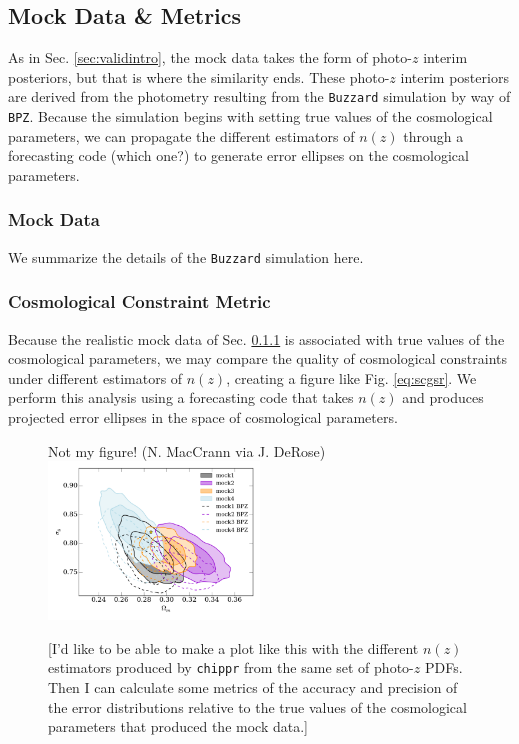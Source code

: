 \documentclass[iop]{emulateapj}
\begin{document}
\subsection{Mock Data \& Metrics}
\label{sec:appintro}

As in Sec. \ref{sec:validintro}, the mock data takes the form of photo-$z$ 
interim posteriors, but that is where the similarity ends.  These photo-$z$ 
interim posteriors are derived from the photometry resulting from the 
\texttt{Buzzard} simulation by way of \texttt{BPZ}.  Because the simulation 
begins with setting true values of the cosmological parameters, we can 
propagate the different estimators of $n(z)$ through a forecasting code (which 
one?) to generate error ellipses on the cosmological parameters.

\subsubsection{Mock Data}
\label{sec:buzzard}

We summarize the details of the \texttt{Buzzard} simulation here.

\subsubsection{Cosmological Constraint Metric}
\label{sec:cosmo}

Because the realistic mock data of Sec. \ref{sec:buzzard} is associated with 
true values of the cosmological parameters, we may compare the quality of 
cosmological constraints under different estimators of $n(z)$, creating a 
figure like Fig. \ref{eq:scgsr}.  We perform this analysis using a forecasting 
code that takes $n(z)$ and produces projected error ellipses in the space of 
cosmological parameters.  

\begin{figure}
	\begin{center}
		Not my figure! (N. MacCrann via J. DeRose)
		\includegraphics[width=0.5\textwidth]{cosmo_constraints.png}
		\caption{[I'd like to be able to make a plot like this with the 
different $n(z)$ estimators produced by \texttt{chippr} from the same set of 
photo-$z$ PDFs.  Then I can calculate some metrics of the accuracy and 
precision of the error distributions relative to the true values of the 
cosmological parameters that produced the mock data.]}
		\label{fig:scgsr}
	\end{center}
\end{figure}
\end{document}
